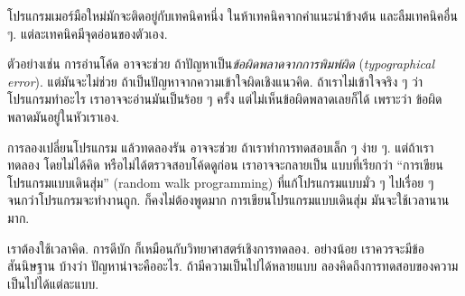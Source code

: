 
โปรแกรมเมอร์มือใหม่มักจะติดอยู่กับเทคนิคหนึ่ง ในห้าเทคนิคจากคำแนะนำข้างต้น และลืมเทคนิคอื่น ๆ.
แต่ละเทคนิคมีจุดอ่อนของตัวเอง.


ตัวอย่างเช่น การอ่านโค้ด อาจจะช่วย ถ้าปัญหาเป็น\textit{ข้อผิดพลาดจากการพิมพ์ผิด} (\textit{typographical error}).
แต่มันจะไม่ช่วย ถ้าเป็นปัญหาจากความเข้าใจผิดเชิงแนวคิด.
ถ้าเราไม่เข้าใจจริง ๆ ว่า โปรแกรมทำอะไร
เราอาจจะอ่านมันเป็นร้อย ๆ ครั้ง แต่ไม่เห็นข้อผิดพลาดเลยก็ได้
เพราะว่า ข้อผิดพลาดมันอยู่ในหัวเราเอง.


การลองเปลี่ยนโปรแกรม แล้วทดลองรัน อาจจะช่วย
ถ้าเราทำการทดสอบเล็ก ๆ ง่าย ๆ.
แต่ถ้าเราทดลอง โดยไม่ได้คิด หรือไม่ได้ตรวจสอบโค้ดดูก่อน
เราอาจจะกลายเป็น แบบที่เรียกว่า ``การเขียนโปรแกรมแบบเดินสุ่ม'' (random walk programming)
ที่แก้โปรแกรมแบบมั่ว ๆ ไปเรื่อย ๆ จนกว่าโปรแกรมจะทำงานถูก.
ก็คงไม่ต้องพูดมาก 
การเขียนโปรแกรมแบบเดินสุ่ม มันจะใช้เวลานานมาก.


เราต้องใช้เวลาคิด.
การดีบัก ก็เหมือนกับวิทยาศาสตร์เชิงการทดลอง.
อย่างน้อย เราควรจะมีข้อสันนิษฐาน บ้างว่า ปัญหาน่าจะคืออะไร.
ถ้ามีความเป็นไปได้หลายแบบ ลองคิดถึงการทดสอบของความเป็นไปได้แต่ละแบบ.

